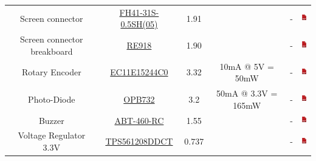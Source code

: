\documentclass[12pt,a4paper,landscape]{article}
\begin{document}
{\begin{tabular}{|c|c|c|c|c|c|}
					Screen connector &
					\href{http://fr.farnell.com/hirose-hrs/fh41-31s-0-5sh-05/conn-ffc-embase-31voies-1rangee/dp/2427829}
					{FH41-31S-0.5SH(05)} & 1.91 & &
					- &
					\href{http://www.farnell.com/datasheets/2169332.pdf}{\includegraphics[height=1em]{pdf.png}}\\
					
					Screen connector breakboard &
					\href{http://uk.farnell.com/roth-elektronik/re918/fpc-ffc-adaptor-fibreglass-1-5mm/dp/2474691?st=adaptor}
					{RE918} & 1.90 & &
					- &
					\href{http://www.farnell.com/datasheets/2169332.pdf}{\includegraphics[height=1em]{pdf.png}}\\
					
					Rotary Encoder &
					\href{http://fr.farnell.com/alps/ec11e15244c0/encodeur-vert-30-crans-15-impul/dp/1520806?st=boutton}
					{EC11E15244C0} & 3.32 & 10mA @ 5V = 50mW & 
					- &
					\href{http://www.farnell.com/datasheets/5205.pdf}{\includegraphics[height=1em]{pdf.png}}\\
					
					Photo-Diode &
					\href{http://fr.farnell.com/optek-technology/opb732/capteur-reflectif-pcb/dp/1226877}
					{OPB732} & 3.2 & 50mA @ 3.3V = 165mW &
					- &
					\href{http://www.farnell.com/datasheets/2331536.pdf}{\includegraphics[height=1em]{pdf.png}}\\
					    
					Buzzer &
					\href{http://fr.farnell.com/pro-signal/abt-460-rc/buzzer-electro-m-canique-2v-4v/dp/2783902}
					{ABT-460-RC} & 1.55 & &
					- & \href{http://www.farnell.com/datasheets/2362849.pdf}{\includegraphics[height=1em]{pdf.png}}\\
					    
					Voltage Regulator 3.3V &
					\href{http://fr.farnell.com/texas-instruments/tps561208ddct/dc-dc-conv-sync-buck-580khz-sot/dp/2766883}
					{TPS561208DDCT} &  0.737 & &
					- &
					\href{http://www.ti.com/lit/ds/symlink/tps561201.pdf}{\includegraphics[height=1em]{pdf.png}}\\
					    

\end{tabular}}
\end{document}
